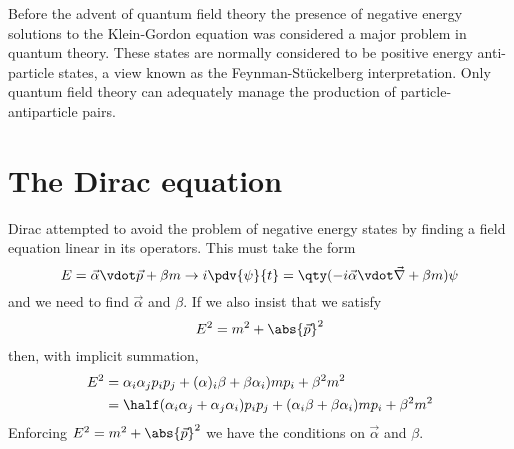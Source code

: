 
Before the advent of quantum field theory the presence of negative
energy solutions to the Klein-Gordon equation was considered a major
problem in quantum theory. These states are normally considered to be
positive energy anti-particle states, a view known as the
Feynman-St\"uckelberg interpretation. Only quantum field theory can
adequately manage the production of particle-antiparticle pairs.

\section{The Dirac equation}
\label{sec:dirac-equation}

Dirac attempted to avoid the problem of negative energy states by
finding a field equation linear in its operators. This must take the
form
\[ E = \vec{\alpha} \vdot \vec{p} + \beta m \to i \pdv{\psi}{t} = \qty(-i \vec{\alpha} \vdot \vec{\nabla} + \beta m) \psi \] and we need to find $\vec{\alpha}$ and $\beta$.
If we also insist that we satisfy
\[ E^2 = m^2 + \abs{\vec{p}}^2 \]
then, with implicit summation,
\begin{align*} E^2 &= \alpha_i \alpha_j p_i p_j + (\alpha)_i \beta + \beta \alpha_i) m p_i + \beta^2 m^2 \\
&= \half(\alpha_i \alpha_j + \alpha_j \alpha_i) p_i p_j + ( \alpha_i \beta + \beta \alpha_i) m p_i + \beta^2 m^2
\end{align*}
Enforcing $E^2 = m^2 + \abs{\vec{p}}^2$ we have the conditions on
$\vec{\alpha}$ and $\beta$.

